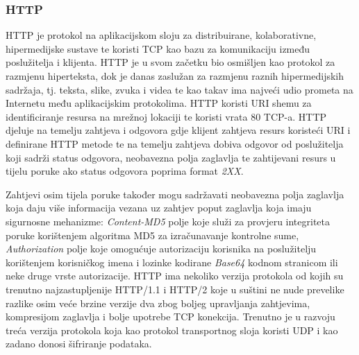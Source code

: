 \documentclass[times, utf8, diplomski]{fer}
\begin{document}
\subsubsection{HTTP}
HTTP  je protokol na aplikacijskom sloju za distribuirane, kolaborativne, hipermedijske sustave te koristi TCP kao bazu za komunikaciju između poslužitelja i klijenta. HTTP je u svom začetku bio osmišljen kao protokol za razmjenu hiperteksta, dok je danas zaslužan za razmjenu raznih hipermedijskih sadržaja, tj. teksta, slike, zvuka i videa te kao takav ima najveći udio prometa na Internetu među aplikacijskim protokolima. HTTP koristi URI  shemu za identificiranje resursa na mrežnoj lokaciji te koristi vrata 80 TCP-a. HTTP djeluje na temelju zahtjeva i odgovora gdje klijent zahtjeva resurs koristeći URI i definirane HTTP metode te na temelju zahtjeva dobiva odgovor od poslužitelja koji sadrži status odgovora, neobavezna polja zaglavlja te zahtijevani resurs u tijelu poruke ako status odgovora poprima format \emph{2XX}. 

Zahtjevi osim tijela poruke također mogu sadržavati neobavezna polja zaglavlja koja daju više informacija vezana uz zahtjev poput zaglavlja koja imaju sigurnosne mehanizme: \emph{Content-MD5} polje koje služi za provjeru integriteta poruke korištenjem algoritma MD5 za izračunavanje kontrolne sume, \emph{Authorization} polje koje omogućuje autorizaciju korisnika na poslužitelju korištenjem korisničkog imena i lozinke kodirane \emph{Base64} kodnom stranicom ili neke druge vrste autorizacije. HTTP ima nekoliko verzija protokola od kojih su trenutno najzastupljenije HTTP/1.1 i HTTP/2 koje u suštini ne nude prevelike razlike osim veće brzine verzije dva zbog boljeg upravljanja zahtjevima, kompresijom zaglavlja i bolje upotrebe TCP konekcija. Trenutno je u razvoju treća verzija protokola koja kao protokol transportnog sloja koristi UDP i kao zadano donosi šifriranje podataka.
\end{document}
